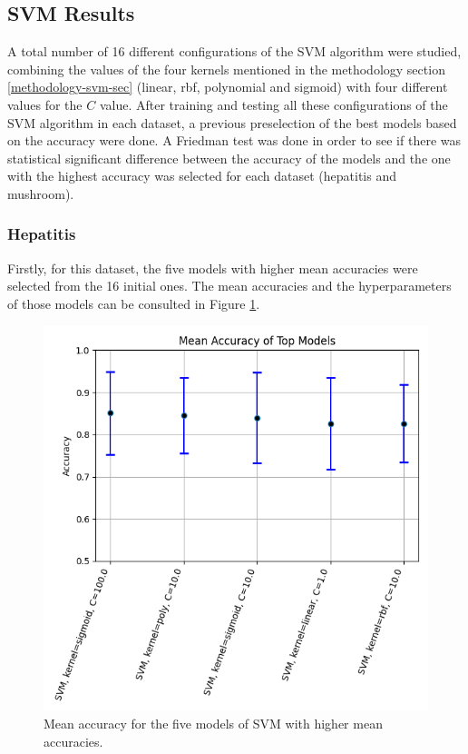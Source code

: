 \subsection{SVM Results}
A total number of 16 different configurations of the SVM algorithm were studied, combining the values of the four kernels mentioned in the methodology section \ref{methodology-svm-sec} (linear, rbf, polynomial and sigmoid) with four different values for the $C$ value. After training and testing all these configurations of the SVM algorithm in each dataset, a previous preselection of the best models based on the accuracy were done. A Friedman test was done in order to see if there was statistical significant difference between the accuracy of the models and the one with the highest accuracy was selected for each dataset (hepatitis and mushroom). 

\subsubsection{Hepatitis}
Firstly, for this dataset, the five models with higher mean accuracies were selected from the 16 initial ones. The mean accuracies and the hyperparameters of those models can be consulted in Figure \ref{fig:hep-svm-1}.

\begin{figure}[t]
    \centering
    \includegraphics[width=\textwidth]{figures/svm/hepatitis/statistical_analysis_results.png}
    \caption{Mean accuracy for the five models of SVM with higher mean accuracies.}
    \label{fig:hep-svm-1}
\end{figure}



